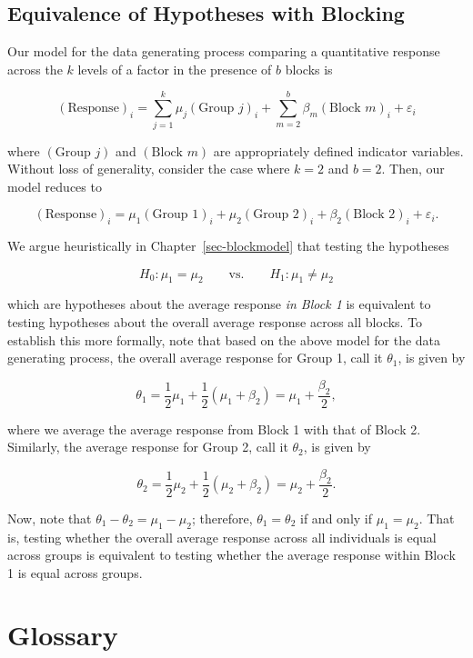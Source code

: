 \documentclass[
  letterpaper,
  DIV=11,
  numbers=noendperiod]{scrreprt}
\theoremstyle{definition}
\theoremstyle{definition}
\theoremstyle{plain}
\theoremstyle{remark}
\begin{document}
\section{Equivalence of Hypotheses with
Blocking}\label{equivalence-of-hypotheses-with-blocking}

Our model for the data generating process comparing a quantitative
response across the \(k\) levels of a factor in the presence of \(b\)
blocks is

\[(\text{Response})_i = \sum_{j=1}^{k} \mu_j (\text{Group } j)_i + \sum_{m=2}^{b} \beta_m (\text{Block } m)_i + \varepsilon_i\]

where \((\text{Group } j)\) and \((\text{Block } m)\) are appropriately
defined indicator variables. Without loss of generality, consider the
case where \(k = 2\) and \(b = 2\). Then, our model reduces to

\[(\text{Response})_i = \mu_1 (\text{Group 1})_i + \mu_2 (\text{Group 2})_i + \beta_2 (\text{Block 2})_i + \varepsilon_i.\]

We argue heuristically in Chapter~\ref{sec-blockmodel} that testing the
hypotheses

\[H_0: \mu_1 = \mu_2 \qquad \text{vs.} \qquad H_1: \mu_1 \neq \mu_2\]

which are hypotheses about the average response \emph{in Block 1} is
equivalent to testing hypotheses about the overall average response
across all blocks. To establish this more formally, note that based on
the above model for the data generating process, the overall average
response for Group 1, call it \(\theta_1\), is given by

\[\theta_1 = \frac{1}{2} \mu_1 + \frac{1}{2} \left(\mu_1 + \beta_2\right) = \mu_1 + \frac{\beta_2}{2},\]

where we average the average response from Block 1 with that of Block 2.
Similarly, the average response for Group 2, call it \(\theta_2\), is
given by

\[\theta_2 = \frac{1}{2} \mu_2 + \frac{1}{2} \left(\mu_2 + \beta_2\right) = \mu_2 + \frac{\beta_2}{2}.\]

Now, note that \(\theta_1 - \theta_2 = \mu_1 - \mu_2\); therefore,
\(\theta_1 = \theta_2\) if and only if \(\mu_1 = \mu_2\). That is,
testing whether the overall average response across all individuals is
equal across groups is equivalent to testing whether the average
response within Block 1 is equal across groups.

\chapter{Glossary}\label{glossary}
\end{document}
